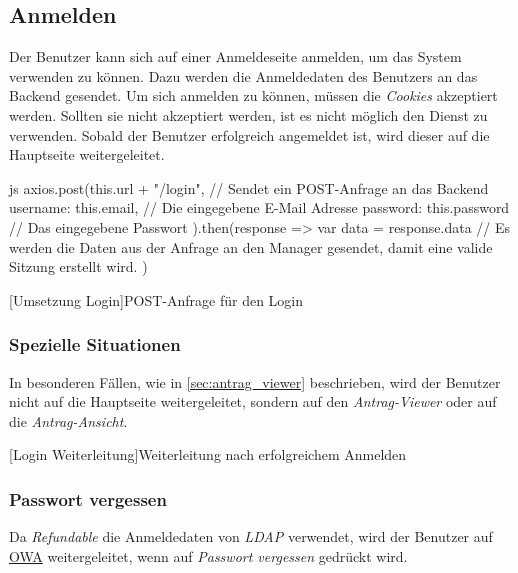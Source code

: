 \subsection{Anmelden}
Der Benutzer kann sich auf einer Anmeldeseite anmelden, um das System verwenden zu können. Dazu werden die Anmeldedaten des Benutzers an das Backend gesendet. Um sich anmelden zu können, müssen die \textit{Cookies} akzeptiert werden. Sollten sie nicht akzeptiert werden, ist es nicht möglich den Dienst zu verwenden.
Sobald der Benutzer erfolgreich angemeldet ist, wird dieser auf die Hauptseite weitergeleitet.
\\
\begin{code}{js}
axios.post(this.url + "/login", {	// Sendet ein POST-Anfrage an das Backend
	username: this.email,	// Die eingegebene E-Mail Adresse
	password: this.password // Das eingegebene Passwort
}).then(response => {
	var data = response.data
	// Es werden die Daten aus der Anfrage an den Manager gesendet, damit eine valide Sitzung erstellt wird.
})
\end{code}
[Umsetzung Login]{POST-Anfrage für den Login}~\\

\subsubsection{Spezielle Situationen}
In besonderen Fällen, wie in \autoref{sec:antrag_viewer} beschrieben, wird der Benutzer nicht auf die Hauptseite weitergeleitet, sondern auf den \textit{Antrag-Viewer} oder auf die \textit{Antrag-Ansicht}.
[Login Weiterleitung]{Weiterleitung nach erfolgreichem Anmelden}~\\
\subsubsection{Passwort vergessen}
Da \textit{Refundable} die Anmeldedaten von \textit{LDAP} verwendet, wird der Benutzer auf \href{https://owa.tgm.ac.at}{OWA} weitergeleitet, wenn auf \textit{Passwort vergessen} gedrückt wird.
\newpage
